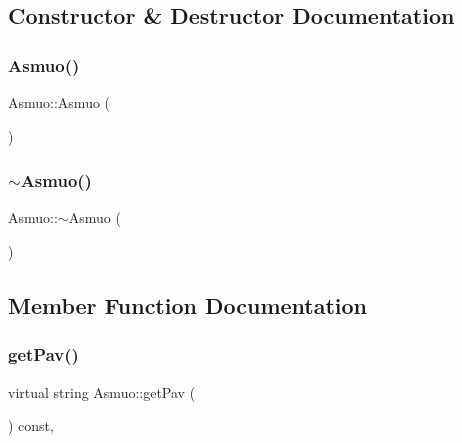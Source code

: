 \subsection{Constructor \& Destructor Documentation}
\mbox{\label{class_asmuo_a56b782374affc03749b66c66a6aa24f6}} 
\subsubsection{\texorpdfstring{Asmuo()}{Asmuo()}}
{\footnotesize\ttfamily Asmuo\+::\+Asmuo (\begin{DoxyParamCaption}{ }\end{DoxyParamCaption})\hspace{0.3cm}{\ttfamily [inline]}}

\mbox{\label{class_asmuo_a999916e776cf2dcd963372ff914b5b16}} 
\subsubsection{\texorpdfstring{$\sim$Asmuo()}{~Asmuo()}}
{\footnotesize\ttfamily Asmuo\+::$\sim$\+Asmuo (\begin{DoxyParamCaption}{ }\end{DoxyParamCaption})\hspace{0.3cm}{\ttfamily [inline]}}



\subsection{Member Function Documentation}
\mbox{\label{class_asmuo_aa2710643b3fc638938a1955f797a2ba4}} 
\subsubsection{\texorpdfstring{getPav()}{getPav()}}
{\footnotesize\ttfamily virtual string Asmuo\+::get\+Pav (\begin{DoxyParamCaption}{ }\end{DoxyParamCaption}) const\hspace{0.3cm}{\ttfamily [inline]}, {\ttfamily [virtual]}}

